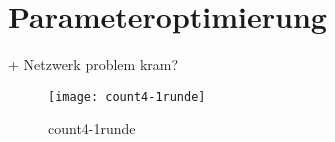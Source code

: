 \section{Parameteroptimierung}


+ Netzwerk problem kram?

\begin{figure}
	\centering
	\texttt{[image: count4-1runde]}
	\caption{count4-1runde}
	\label{fig:count4-1runde}
\end{figure}